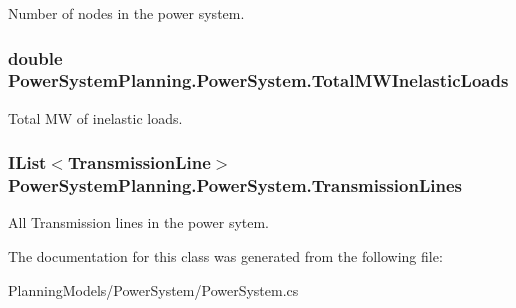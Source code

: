 Number of nodes in the power system. 

\subsubsection[{\texorpdfstring{Total\+M\+W\+Inelastic\+Loads}{TotalMWInelasticLoads}}]{\setlength{\rightskip}{0pt plus 5cm}double Power\+System\+Planning.\+Power\+System.\+Total\+M\+W\+Inelastic\+Loads\hspace{0.3cm}{\ttfamily [get]}}\hypertarget{class_power_system_planning_1_1_power_system_ade5099d2eb198a61bf794e14ce4b3018}{}\label{class_power_system_planning_1_1_power_system_ade5099d2eb198a61bf794e14ce4b3018}


Total MW of inelastic loads. 

\subsubsection[{\texorpdfstring{Transmission\+Lines}{TransmissionLines}}]{\setlength{\rightskip}{0pt plus 5cm}I\+List$<${\bf Transmission\+Line}$>$ Power\+System\+Planning.\+Power\+System.\+Transmission\+Lines\hspace{0.3cm}{\ttfamily [get]}}\hypertarget{class_power_system_planning_1_1_power_system_a8b2c36218174e515b9ab0ef34531435f}{}\label{class_power_system_planning_1_1_power_system_a8b2c36218174e515b9ab0ef34531435f}


All Transmission lines in the power sytem. 



The documentation for this class was generated from the following file\+:\begin{DoxyCompactItemize}
\item 
Planning\+Models/\+Power\+System/Power\+System.\+cs\end{DoxyCompactItemize}
